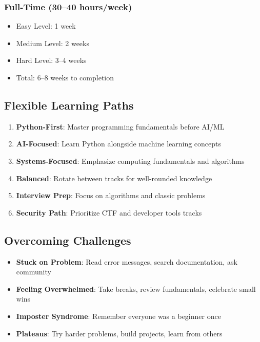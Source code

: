 \documentclass[11pt,letterpaper]{article}
\begin{document}
\subsubsection{Full-Time (30--40 hours/week)}
\begin{itemize}[leftmargin=*]
    \item Easy Level: 1 week
    \item Medium Level: 2 weeks
    \item Hard Level: 3--4 weeks
    \item Total: 6--8 weeks to completion
\end{itemize}

\subsection{Flexible Learning Paths}
\begin{enumerate}[leftmargin=*]
    \item \textbf{Python-First}: Master programming fundamentals before AI/ML
    \item \textbf{AI-Focused}: Learn Python alongside machine learning concepts
    \item \textbf{Systems-Focused}: Emphasize computing fundamentals and algorithms
    \item \textbf{Balanced}: Rotate between tracks for well-rounded knowledge
    \item \textbf{Interview Prep}: Focus on algorithms and classic problems
    \item \textbf{Security Path}: Prioritize CTF and developer tools tracks
\end{enumerate}

\subsection{Overcoming Challenges}
\begin{itemize}[leftmargin=*]
    \item \textbf{Stuck on Problem}: Read error messages, search documentation, ask community
    \item \textbf{Feeling Overwhelmed}: Take breaks, review fundamentals, celebrate small wins
    \item \textbf{Imposter Syndrome}: Remember everyone was a beginner once
    \item \textbf{Plateaus}: Try harder problems, build projects, learn from others
\end{itemize}
\end{document}
